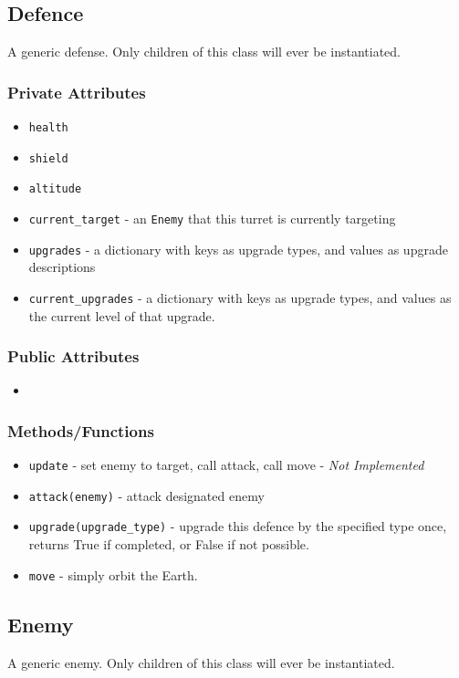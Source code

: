 \documentclass[12pt]{article}
\begin{document}
\subsection*{Defence} A generic defense. Only children of this class will ever
be instantiated.
\subsubsection*{Private Attributes}
\begin{itemize}
\item \texttt{health}
\item \texttt{shield}
\item \texttt{altitude}
\item \texttt{current\_target} - an \texttt{Enemy} that this turret is currently
targeting
\item \texttt{upgrades} - a dictionary with keys as upgrade types, and values as
upgrade descriptions
\item \texttt{current\_upgrades} - a dictionary with keys as upgrade types, and
values as the current level of that upgrade.
\end{itemize}
\subsubsection*{Public Attributes}
\begin{itemize}
\item 
\end{itemize}
\subsubsection*{Methods/Functions}
\begin{itemize}
\item \texttt{update} - set enemy to target, call attack, call move - 
\textit{Not Implemented}
\item \texttt{attack(enemy)} - attack designated enemy
\item \texttt{upgrade(upgrade\_type)} - upgrade this defence by the specified
type once, returns True if completed, or False if not possible.
\item \texttt{move} - simply orbit the Earth.
\end{itemize}

\subsection*{Enemy} A generic enemy. Only children of this class will ever
be instantiated.
\end{document}
